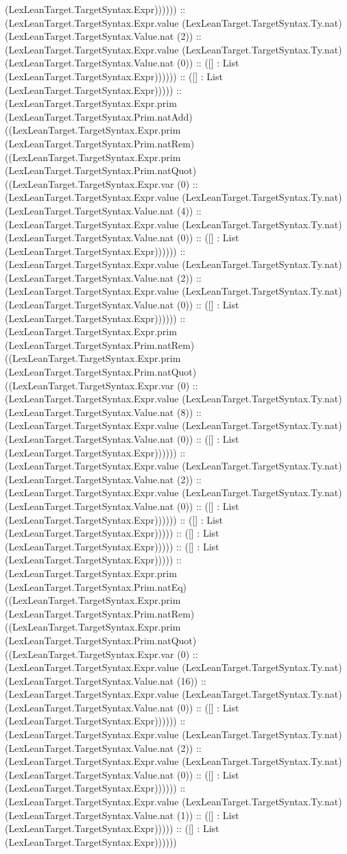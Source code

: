 \documentclass[11pt]{article}
\begin{document}
(LexLeanTarget.TargetSyntax.Expr)))))) :: (LexLeanTarget.TargetSyntax.Expr.value (LexLeanTarget.TargetSyntax.Ty.nat) (LexLeanTarget.TargetSyntax.Value.nat (2)) :: (LexLeanTarget.TargetSyntax.Expr.value (LexLeanTarget.TargetSyntax.Ty.nat) (LexLeanTarget.TargetSyntax.Value.nat (0)) :: ([] : List (LexLeanTarget.TargetSyntax.Expr)))))) :: ([] : List (LexLeanTarget.TargetSyntax.Expr))))) :: (LexLeanTarget.TargetSyntax.Expr.prim (LexLeanTarget.TargetSyntax.Prim.natAdd) ((LexLeanTarget.TargetSyntax.Expr.prim (LexLeanTarget.TargetSyntax.Prim.natRem) ((LexLeanTarget.TargetSyntax.Expr.prim (LexLeanTarget.TargetSyntax.Prim.natQuot) ((LexLeanTarget.TargetSyntax.Expr.var (0) :: (LexLeanTarget.TargetSyntax.Expr.value (LexLeanTarget.TargetSyntax.Ty.nat) (LexLeanTarget.TargetSyntax.Value.nat (4)) :: (LexLeanTarget.TargetSyntax.Expr.value (LexLeanTarget.TargetSyntax.Ty.nat) (LexLeanTarget.TargetSyntax.Value.nat (0)) :: ([] : List (LexLeanTarget.TargetSyntax.Expr)))))) :: (LexLeanTarget.TargetSyntax.Expr.value (LexLeanTarget.TargetSyntax.Ty.nat) (LexLeanTarget.TargetSyntax.Value.nat (2)) :: (LexLeanTarget.TargetSyntax.Expr.value (LexLeanTarget.TargetSyntax.Ty.nat) (LexLeanTarget.TargetSyntax.Value.nat (0)) :: ([] : List (LexLeanTarget.TargetSyntax.Expr)))))) :: (LexLeanTarget.TargetSyntax.Expr.prim (LexLeanTarget.TargetSyntax.Prim.natRem) ((LexLeanTarget.TargetSyntax.Expr.prim (LexLeanTarget.TargetSyntax.Prim.natQuot) ((LexLeanTarget.TargetSyntax.Expr.var (0) :: (LexLeanTarget.TargetSyntax.Expr.value (LexLeanTarget.TargetSyntax.Ty.nat) (LexLeanTarget.TargetSyntax.Value.nat (8)) :: (LexLeanTarget.TargetSyntax.Expr.value (LexLeanTarget.TargetSyntax.Ty.nat) (LexLeanTarget.TargetSyntax.Value.nat (0)) :: ([] : List (LexLeanTarget.TargetSyntax.Expr)))))) :: (LexLeanTarget.TargetSyntax.Expr.value (LexLeanTarget.TargetSyntax.Ty.nat) (LexLeanTarget.TargetSyntax.Value.nat (2)) :: (LexLeanTarget.TargetSyntax.Expr.value (LexLeanTarget.TargetSyntax.Ty.nat) (LexLeanTarget.TargetSyntax.Value.nat (0)) :: ([] : List (LexLeanTarget.TargetSyntax.Expr)))))) :: ([] : List (LexLeanTarget.TargetSyntax.Expr))))) :: ([] : List (LexLeanTarget.TargetSyntax.Expr))))) :: ([] : List (LexLeanTarget.TargetSyntax.Expr))))) :: (LexLeanTarget.TargetSyntax.Expr.prim (LexLeanTarget.TargetSyntax.Prim.natEq) ((LexLeanTarget.TargetSyntax.Expr.prim (LexLeanTarget.TargetSyntax.Prim.natRem) ((LexLeanTarget.TargetSyntax.Expr.prim (LexLeanTarget.TargetSyntax.Prim.natQuot) ((LexLeanTarget.TargetSyntax.Expr.var (0) :: (LexLeanTarget.TargetSyntax.Expr.value (LexLeanTarget.TargetSyntax.Ty.nat) (LexLeanTarget.TargetSyntax.Value.nat (16)) :: (LexLeanTarget.TargetSyntax.Expr.value (LexLeanTarget.TargetSyntax.Ty.nat) (LexLeanTarget.TargetSyntax.Value.nat (0)) :: ([] : List (LexLeanTarget.TargetSyntax.Expr)))))) :: (LexLeanTarget.TargetSyntax.Expr.value (LexLeanTarget.TargetSyntax.Ty.nat) (LexLeanTarget.TargetSyntax.Value.nat (2)) :: (LexLeanTarget.TargetSyntax.Expr.value (LexLeanTarget.TargetSyntax.Ty.nat) (LexLeanTarget.TargetSyntax.Value.nat (0)) :: ([] : List (LexLeanTarget.TargetSyntax.Expr)))))) :: (LexLeanTarget.TargetSyntax.Expr.value (LexLeanTarget.TargetSyntax.Ty.nat) (LexLeanTarget.TargetSyntax.Value.nat (1)) :: ([] : List (LexLeanTarget.TargetSyntax.Expr))))) :: ([] : List (LexLeanTarget.TargetSyntax.Expr)))))) 
\end{document}

